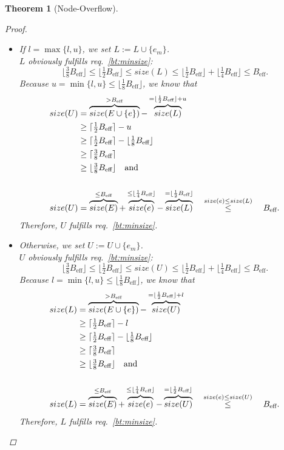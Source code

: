 \documentclass[a4paper, 9pt]{scrartcl}
\theoremstyle{plain}
\newtheorem{thm}{Theorem}[section]
\theoremstyle{definition}
\theoremstyle{remark}
\newcommand{\Beff}{ B_{\text{eff}} }
\begin{document}
\begin{multicols}{2}
\begin{thm}[Node-Overflow]
\begin{proof}
\begin{description}
\begin{itemize}
\item If \mbox{$l = \max \{l, u\}$}, we set \mbox{$L := L \cup \{ e_m \}$}.\\
	$L$ obviously fulfills req.~\ref{bt:minsize}:
	\[ \lfloor \tfrac{3}{8} \Beff \rfloor
		\leq \lfloor \tfrac{1}{2} \Beff \rfloor
		\leq size(L)
		\leq \lfloor \tfrac{1}{2} \Beff \rfloor
			+ \lfloor \tfrac{1}{4} \Beff \rfloor
		\leq \Beff. \]
	Because \mbox{$u = \min \{l, u\} \leq \lfloor \tfrac{1}{8} \Beff \rfloor$}, 
	we know that 
	\begin{align*}
	size(U) &= \overbrace{size(E \cup \{e\})}^{> \Beff}
		- \overbrace{size(L)}^{= \lfloor \frac{1}{2} \Beff \rfloor + u}\\
		& \geq \lceil \tfrac{1}{2} \Beff \rceil - u\\
		& \geq \lceil \tfrac{1}{2} \Beff \rceil
			- \lfloor \tfrac{1}{8} \Beff \rfloor\\
		& \geq \lceil \tfrac{3}{8} \Beff \rceil\\
		& \geq \lfloor \tfrac{3}{8} \Beff \rfloor \text{\quad and}\\
	\\
	size(U) & = \overbrace{size(E)}^{\leq \Beff}
		+ \overbrace{size(e)}^{\leq \lfloor \frac{1}{4} \Beff \rfloor}
		- \overbrace{size(L)}^{= \lfloor \frac{1}{2} \Beff \rfloor}
		\stackrel{\quad size(e) \leq size(L) \quad}{\leq} \Beff.
	\end{align*}
	Therefore, $U$ fulfills req.~\ref{bt:minsize}.
\item Otherwise, we set \mbox{$U := U \cup \{ e_m \}$}.\\
	$U$ obviously fulfills req.~\ref{bt:minsize}:
	\[ \lfloor \tfrac{3}{8} \Beff \rfloor
		\leq \lfloor \tfrac{1}{2} \Beff \rfloor
		\leq size(U)
		\leq \lfloor \tfrac{1}{2} \Beff \rfloor
			+ \lfloor \tfrac{1}{4} \Beff \rfloor
		\leq \Beff. \]
	Because \mbox{$l = \min \{l, u\} \leq \lfloor \tfrac{1}{8} \Beff \rfloor$}, 
	we know that 
	\begin{align*}
	size(L) &= \overbrace{size(E \cup \{e\})}^{> \Beff}
		- \overbrace{size(U)}^{= \lfloor \frac{1}{2} \Beff \rfloor + l}\\
		& \geq \lceil \tfrac{1}{2} \Beff \rceil - l\\
		& \geq \lceil \tfrac{1}{2} \Beff \rceil
			- \lfloor \tfrac{1}{8} \Beff \rfloor\\
		& \geq \lceil \tfrac{3}{8} \Beff \rceil\\
		& \geq \lfloor \tfrac{3}{8} \Beff \rfloor \text{\quad and}\\
	\\
	size(L) & = \overbrace{size(E)}^{\leq \Beff}
		+ \overbrace{size(e)}^{\leq \lfloor \frac{1}{4} \Beff \rfloor}
		- \overbrace{size(U)}^{= \lfloor \frac{1}{2} \Beff \rfloor}
		\stackrel{\quad size(e) \leq size(U) \quad}{\leq} \Beff.
	\end{align*}
	Therefore, $L$ fulfills req.~\ref{bt:minsize}.
\end{itemize}
\end{description}
\end{proof}
\end{thm}
\fi



\end{multicols}
\end{document}
